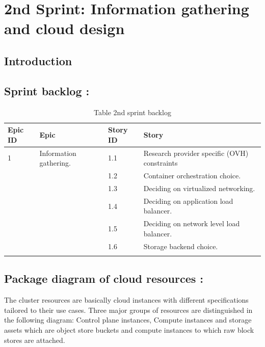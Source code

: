 \graphicspath{{./assets/}}
\setcounter{mtc}{4}
\chapter{2nd Sprint: Information gathering and cloud design }
\minitoc
\newpage

\section*{Introduction}

\section{Sprint backlog :}

\begin{longtable}[H]{|m{1.5cm}|m{3cm}|m{1.5cm}|m{8cm}|}
\hline
{\textbf{Epic ID}} & {\textbf{Epic}} & {\textbf{Story ID}} & {\textbf{Story}}\\
\hline
1  & Information gathering.	 &  1.1	 &  Research provider specific (OVH) constraints\\
\cline{3-4}
& & 1.2 & Container orchestration choice. \\
\cline{3-4}
& & 1.3	& Deciding on virtualized networking. \\
\cline{3-4}
& & 1.4	& Deciding on application load balancer. \\
\cline{3-4}
& & 1.5	& Deciding on network level load balancer. \\
\cline{3-4}
& & 1.6	& Storage backend choice.\\
\hline
\caption{Table 2nd sprint backlog}
\end{longtable}


\section{Package diagram of cloud resources :}

The cluster resources are basically cloud instances with different specifications tailored to their use cases. Three major groups of resources are distinguished in the following diagram: Control plane instances, Compute instances and storage assets which are object store buckets and compute instances to which raw block stores are attached.

